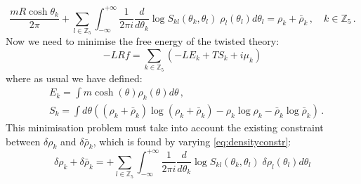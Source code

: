 \documentclass[a4paper,11pt]{article}
\begin{document}
\begin{equation}
    \label{eq:densityconstr}
    \frac{m R \cosh{\theta_{k}}}{2\pi} +\sum_{l \in \mathbb{Z}_5}\int_{-\infty}^{+\infty} \frac{1}{2\pi i}\frac{d}{d\theta_{k}}\log{S_{kl}(\theta_{{k}},\theta_{{l}})}\;\rho_{l}(\theta_{{l}})d\theta_{{l}}= \rho_{k}+\bar{\rho}_{k}\,,\quad k \in \mathbb{Z}_5\,. 
\end{equation}
Now we need to minimise the free energy of the twisted theory:
\begin{equation}
   - L R f=\sum_{k\in \mathbb{Z}_5}(-L E_k + T S_k+i \mu_{k})
\end{equation}
where as usual we have defined:
\begin{align}
    &E_k=\int m \cosh(\theta) \rho_k(\theta)d\theta\,,\\&
    S_k=\int d\theta((\rho_{k}+\bar\rho_k)\log{(\rho_{k}+\bar\rho_k)}-\rho_{k}\log{\rho_{k}}-\bar\rho_{k}\log{\bar\rho_{k}})\,.
\end{align}
This minimisation problem must take into account the existing constraint between $\delta \rho_k$ and $\delta \bar\rho_k$, which is found by varying \eqref{eq:densityconstr}:
\begin{equation}
    \delta \rho_k+\delta \bar\rho_k= +\sum_{l \in \mathbb{Z}_5}\int_{-\infty}^{+\infty} \frac{1}{2\pi i}\frac{d}{d\theta_{k}}\log{S_{kl}(\theta_{{k}},\theta_{{l}})}\;\delta\rho_{l}(\theta_{{l}})d\theta_{{l}}
\end{equation}
\end{document}
